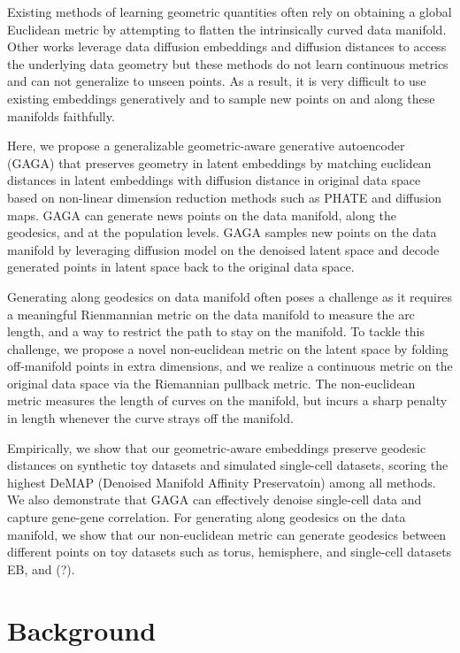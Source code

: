 \documentclass{article}
\theoremstyle{plain}
\theoremstyle{definition}
\theoremstyle{remark}
\begin{document}
Existing methods of learning geometric quantities often rely on obtaining a global Euclidean metric by attempting to flatten the intrinsically curved data manifold. Other works leverage data diffusion embeddings and diffusion distances to access the underlying data geometry but these methods do not learn continuous metrics and can not generalize to unseen points.  As a result, it is very difficult to use existing embeddings generatively and to sample new points on and along these manifolds faithfully.

Here, we propose a generalizable geometric-aware generative autoencoder (GAGA) that preserves geometry in latent embeddings by matching euclidean distances in latent embeddings with diffusion distance in original data space based on non-linear dimension reduction methods such as PHATE and diffusion maps. GAGA can generate news points on the data manifold, along the geodesics, and at the population levels. GAGA samples new points on the data manifold by leveraging diffusion model on the denoised latent space and decode generated points in latent space back to the original data space. 

Generating along geodesics on data manifold often poses a challenge as it requires a meaningful Rienmannian metric on the data manifold to measure the arc length, and a way to restrict the path to stay on the manifold. To tackle this challenge, we propose a novel non-euclidean metric on the latent space by folding off-manifold points in extra dimensions, and we realize a continuous metric on the original data space via the Riemannian pullback metric. The non-euclidean metric measures the length of curves on the manifold, but incurs a sharp penalty in length whenever the curve strays off the manifold.


Empirically, we show that our geometric-aware embeddings preserve geodesic distances on synthetic toy datasets and simulated single-cell datasets, scoring the highest DeMAP (Denoised Manifold Affinity Preservatoin) among all methods. We also demonstrate that GAGA can effectively denoise single-cell data and capture gene-gene correlation. For generating along geodesics on the data manifold, we show that our non-euclidean metric can generate geodesics between different points on toy datasets such as torus, hemisphere, and single-cell datasets EB, and (?). 


\section{Background}
\end{document}
